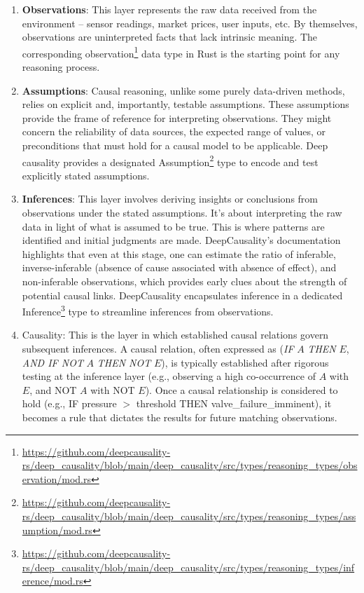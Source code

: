 \begin{enumerate}
    \item \textbf{Observations}: This layer represents the raw data received from the environment – sensor readings, market prices, user inputs, etc. By themselves, observations are uninterpreted facts that lack intrinsic meaning. The corresponding observation\footnote{\url{https://github.com/deepcausality-rs/deep_causality/blob/main/deep_causality/src/types/reasoning_types/observation/mod.rs}} data type in Rust is the starting point for any reasoning process.
    
    \item \textbf{Assumptions}: Causal reasoning, unlike some purely data-driven methods, relies on explicit and, importantly, testable assumptions. These assumptions provide the frame of reference for interpreting observations. They might concern the reliability of data sources, the expected range of values, or preconditions that must hold for a causal model to be applicable. Deep causality provides a designated Assumption\footnote{\url{https://github.com/deepcausality-rs/deep_causality/blob/main/deep_causality/src/types/reasoning_types/assumption/mod.rs}} type to encode and test explicitly stated assumptions. 
   
    \item \textbf{Inferences}: This layer involves deriving insights or conclusions from observations under the stated assumptions. It's about interpreting the raw data in light of what is assumed to be true. This is where patterns are identified and initial judgments are made. DeepCausality's documentation highlights that even at this stage, one can estimate the ratio of inferable, inverse-inferable (absence of cause associated with absence of effect), and non-inferable observations, which provides early clues about the strength of potential causal links. DeepCausality encapsulates inference in a dedicated Inference\footnote{\url{https://github.com/deepcausality-rs/deep_causality/blob/main/deep_causality/src/types/reasoning_types/inference/mod.rs}} type to streamline inferences from observations.

    \item Causality: This is the layer in which established causal relations govern subsequent inferences. A causal relation, often expressed as (\textit{IF} $A$ \textit{THEN} $E$, \textit{AND IF NOT} $A$ \textit{THEN NOT} $E$), is typically established after rigorous testing at the inference layer (e.g., observing a high co-occurrence of $A$ with $E$, and NOT $A$ with NOT $E$). Once a causal relationship is considered to hold (e.g., IF pressure $>$ threshold THEN valve\_failure\_imminent), it becomes a rule that dictates the results for future matching observations.
\end{enumerate}

